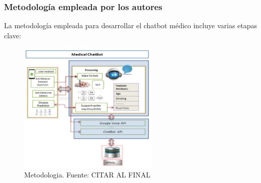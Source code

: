 \subsubsection{Metodología empleada por los autores}
La metodología empleada para desarrollar el chatbot médico incluye varias etapas clave:

\begin{figure}[h]
	\begin{center}
		\includegraphics[width=0.6\textwidth]{2/1_antecedentes/Metodologia-10.png}
		\caption{Metodologia. Fuente: CITAR AL FINAL }
	\end{center}
\end{figure}

